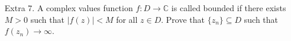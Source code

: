 \documentclass[11pt]{article}
\begin{document}
\begin{enumerate}
\begin{enumerate}
		\item Prove that $\lim_{z \rightarrow \infty} \frac{1}{z} = 0$
		
		\begin{proof}
			 We want to show that for any $\epsilon > 0$, there is a $\delta > 0$ so that if $|z| > \delta$ then $|f(z) - 0| < \epsilon$. Let $\delta = \frac{1}{\epsilon} >0$.
			 
			 \bigskip
			 
			 If $|z| > \delta$, then $|z| > \frac{1}{\epsilon}$. If we take the reciprocal of both sides, we get
			 \[f(z) = \frac{1}{|z|} < \epsilon \]
			 
			 as we set out to prove.			 
		\end{proof}
	\end{enumerate}
	
	\item[Extra 7.] A complex values function $f: D \rightarrow \mathbb{C}$ is called bounded if there exists $M > 0$ such that $|f(z)| < M$ for all $z \in D$. Prove that $\{z_n\} \subseteq D$ such that $f(z_n) \rightarrow \infty$.
\end{enumerate}
\end{document}
